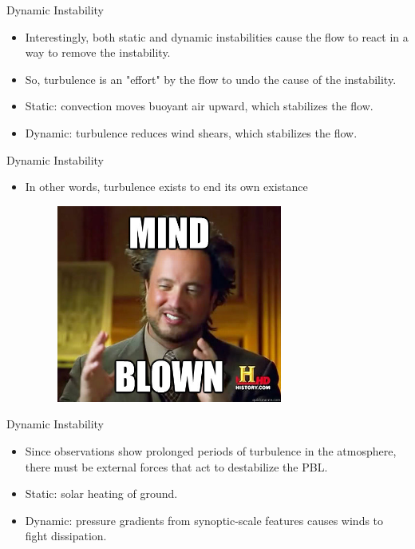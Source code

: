 \begin{frame}{Dynamic Instability}
\begin{itemize}
	\item Interestingly, both static and dynamic instabilities cause the flow to react in a way to remove the instability.
	\item So, turbulence is an "effort" by the flow to undo the cause of the instability.
	\item Static: convection moves buoyant air upward, which stabilizes the flow.
	\item Dynamic: turbulence reduces wind shears, which stabilizes the flow.
\end{itemize}
\end{frame}
\begin{frame}{Dynamic Instability}
\begin{itemize}
	\item In other words, turbulence exists to end its own existance
	\begin{figure}
		\includegraphics[width=0.7\textwidth]{mindblown}
	\end{figure}
\end{itemize}
\end{frame}
\begin{frame}{Dynamic Instability}
\begin{itemize}
	\item Since observations show prolonged periods of turbulence in the atmosphere, there must be external forces that act to destabilize the PBL.
	\item Static: solar heating of ground.
	\item Dynamic: pressure gradients from synoptic-scale features causes winds to fight dissipation.
\end{itemize}
\end{frame}
